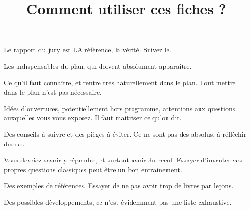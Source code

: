 \documentclass{agregfiche}
\title{Comment utiliser ces fiches ?}
\begin{document}
\maketitle
\secrapports
Le rapport du jury est LA référence, la vérité. Suivez le.
\secindispensables

Les indispensables du plan, qui doivent absolument apparaître.

\secasavoir

Ce qu'il faut connaître, et rentre très naturellement dans le plan. Tout mettre dans le plan n'est pas nécessaire.

\secidees

Idées d'ouvertures, potentiellement hors programme, attentions aux questions auxquelles vous vous exposez. Il faut maitriser ce qu'on dit.

\secpieges

Des conseils à suivre et des pièges à éviter. Ce ne sont pas des absolus, à réfléchir dessus.

\secquestionsclassiques

Vous devriez savoir y répondre, et surtout avoir du recul. Essayer d'inventer vos propres questions classiques peut être un bon entrainement.

\secreferences

Des exemples de références. Essayer de ne pas avoir trop de livres par leçons. 


\secdev
Des possibles développements, ce n'est évidemment pas une liste exhaustive. 
\end{document}
